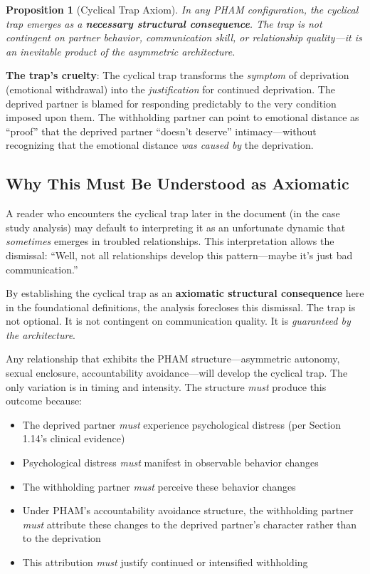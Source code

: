 \documentclass[12pt,openany]{book}
\newtheorem{proposition}{Proposition}[chapter]
\numberwithin{equation}{chapter}
\begin{document}
\begin{proposition}[Cyclical Trap Axiom]
In any PHAM configuration, the cyclical trap emerges as a \textbf{necessary structural consequence}. The trap is not contingent on partner behavior, communication skill, or relationship quality---it is an inevitable product of the asymmetric architecture.
\end{proposition}

\textbf{The trap's cruelty}: The cyclical trap transforms the \textit{symptom} of deprivation (emotional withdrawal) into the \textit{justification} for continued deprivation. The deprived partner is blamed for responding predictably to the very condition imposed upon them. The withholding partner can point to emotional distance as ``proof'' that the deprived partner ``doesn't deserve'' intimacy---without recognizing that the emotional distance \textit{was caused by} the deprivation.

\subsection{Why This Must Be Understood as Axiomatic}

A reader who encounters the cyclical trap later in the document (in the case study analysis) may default to interpreting it as an unfortunate dynamic that \textit{sometimes} emerges in troubled relationships. This interpretation allows the dismissal: ``Well, not all relationships develop this pattern---maybe it's just bad communication.''

By establishing the cyclical trap as an \textbf{axiomatic structural consequence} here in the foundational definitions, the analysis forecloses this dismissal. The trap is not optional. It is not contingent on communication quality. It is \textit{guaranteed by the architecture}.

Any relationship that exhibits the PHAM structure---asymmetric autonomy, sexual enclosure, accountability avoidance---will develop the cyclical trap. The only variation is in timing and intensity. The structure \textit{must} produce this outcome because:

\begin{itemize}
    \item The deprived partner \textit{must} experience psychological distress (per Section 1.14's clinical evidence)
    \item Psychological distress \textit{must} manifest in observable behavior changes
    \item The withholding partner \textit{must} perceive these behavior changes
    \item Under PHAM's accountability avoidance structure, the withholding partner \textit{must} attribute these changes to the deprived partner's character rather than to the deprivation
    \item This attribution \textit{must} justify continued or intensified withholding
\end{itemize}
\end{document}

